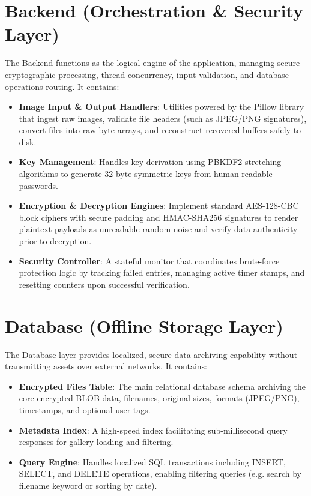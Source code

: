 \documentclass[12pt,a4paper]{report}
\begin{document}
\section{Backend (Orchestration \& Security Layer)}
The Backend functions as the logical engine of the application, managing secure cryptographic processing, thread concurrency, input validation, and database operations routing. It contains:
\begin{itemize}
    \item \textbf{Image Input \& Output Handlers}: Utilities powered by the Pillow library that ingest raw images, validate file headers (such as JPEG/PNG signatures), convert files into raw byte arrays, and reconstruct recovered buffers safely to disk.
    \item \textbf{Key Management}: Handles key derivation using PBKDF2 stretching algorithms to generate 32-byte symmetric keys from human-readable passwords.
    \item \textbf{Encryption \& Decryption Engines}: Implement standard AES-128-CBC block ciphers with secure padding and HMAC-SHA256 signatures to render plaintext payloads as unreadable random noise and verify data authenticity prior to decryption.
    \item \textbf{Security Controller}: A stateful monitor that coordinates brute-force protection logic by tracking failed entries, managing active timer stamps, and resetting counters upon successful verification.
\end{itemize}

\section{Database (Offline Storage Layer)}
The Database layer provides localized, secure data archiving capability without transmitting assets over external networks. It contains:
\begin{itemize}
    \item \textbf{Encrypted Files Table}: The main relational database schema archiving the core encrypted BLOB data, filenames, original sizes, formats (JPEG/PNG), timestamps, and optional user tags.
    \item \textbf{Metadata Index}: A high-speed index facilitating sub-millisecond query responses for gallery loading and filtering.
    \item \textbf{Query Engine}: Handles localized SQL transactions including INSERT, SELECT, and DELETE operations, enabling filtering queries (e.g. search by filename keyword or sorting by date).
\end{itemize}
\end{document}
